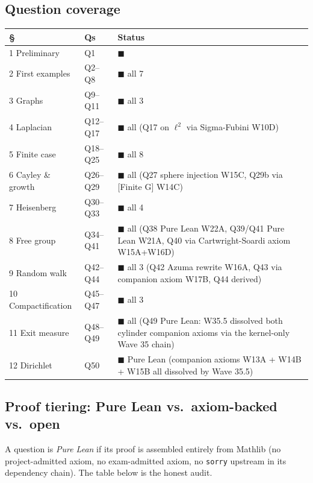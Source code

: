 \documentclass[11pt,a4paper]{article}
\newcommand{\done}[1]{\textcolor{donegreen}{\textbf{#1}}}
\newcommand{\cmd}[1]{\texttt{\small #1}}
\theoremstyle{plain}
\theoremstyle{definition}
\begin{document}
\subsection{Question coverage}

\begin{center}
\renewcommand{\arraystretch}{1.1}
\small
\begin{tabular}{llp{8cm}}
\toprule
\textbf{\S} & \textbf{Qs} & \textbf{Status} \\
\midrule
1 Preliminary     & Q1    & \done{$\blacksquare$} \\
2 First examples  & Q2--Q8 & \done{$\blacksquare$} all 7 \\
3 Graphs          & Q9--Q11 & \done{$\blacksquare$} all 3 \\
4 Laplacian       & Q12--Q17 & \done{$\blacksquare$} all (Q17 on $\ell^2$ via Sigma-Fubini W10D) \\
5 Finite case     & Q18--Q25 & \done{$\blacksquare$} all 8 \\
6 Cayley \& growth & Q26--Q29 &
  \done{$\blacksquare$} all (Q27 sphere injection W15C, Q29b via [Finite G] W14C) \\
7 Heisenberg      & Q30--Q33 & \done{$\blacksquare$} all 4 \\
8 Free group      & Q34--Q41 &
  \done{$\blacksquare$} all (Q38 Pure Lean W22A, Q39/Q41 Pure Lean W21A, Q40 via Cartwright-Soardi axiom W15A+W16D) \\
9 Random walk     & Q42--Q44 &
  \done{$\blacksquare$} all 3 (Q42 Azuma rewrite W16A, Q43 via companion axiom W17B, Q44 derived) \\
10 Compactification & Q45--Q47 & \done{$\blacksquare$} all 3 \\
11 Exit measure   & Q48--Q49 & \done{$\blacksquare$} all (Q49 Pure Lean: W35.5 dissolved both cylinder companion axioms via the kernel-only Wave 35 chain) \\
12 Dirichlet      & Q50      & \done{$\blacksquare$} Pure Lean (companion axioms W13A + W14B + W15B all dissolved by Wave 35.5) \\
\bottomrule
\end{tabular}
\end{center}

\subsection{Proof tiering: Pure Lean vs.\ axiom-backed vs.\ open}
\label{sec:tiering}

A question is \emph{Pure Lean} if its proof is assembled entirely from
Mathlib (no project-admitted axiom, no exam-admitted axiom, no
\cmd{sorry} upstream in its dependency chain). The table below is the
honest audit.
\end{document}
